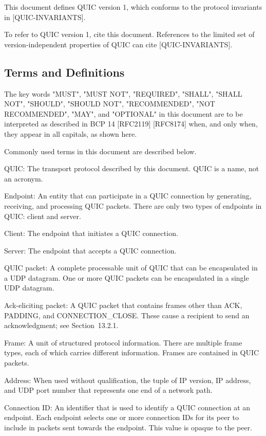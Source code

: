 \documentclass{article}
\begin{document}
\begin{itemize}
\begin{itemize}
This document defines QUIC version 1, which conforms to the protocol invariants in [QUIC-INVARIANTS].

To refer to QUIC version 1, cite this document.  References to the limited set of version-independent properties of QUIC can cite [QUIC-INVARIANTS].

\end{itemize}
\end{itemize}
\subsection{Terms and Definitions}

The key words "MUST", "MUST NOT", "REQUIRED", "SHALL", "SHALL NOT", "SHOULD", "SHOULD NOT", "RECOMMENDED", "NOT RECOMMENDED", "MAY", and "OPTIONAL" in this document are to be interpreted as described in BCP 14 [RFC2119] [RFC8174] when, and only when, they appear in all capitals, as shown here.

Commonly used terms in this document are described below.

QUIC:  The transport protocol described by this document.  QUIC is a name, not an acronym.

Endpoint:  An entity that can participate in a QUIC connection by generating, receiving, and processing QUIC packets.  There are only two types of endpoints in QUIC: client and server.

Client:  The endpoint that initiates a QUIC connection.

Server:  The endpoint that accepts a QUIC connection.

QUIC packet:  A complete processable unit of QUIC that can be encapsulated in a UDP datagram.  One or more QUIC packets can be encapsulated in a single UDP datagram.

Ack-eliciting packet:  A QUIC packet that contains frames other than ACK, PADDING, and CONNECTION\_CLOSE.  These cause a recipient to send an acknowledgment; see Section~13.2.1.

Frame:  A unit of structured protocol information.  There are multiple frame types, each of which carries different information. Frames are contained in QUIC packets.

Address:  When used without qualification, the tuple of IP version, IP address, and UDP port number that represents one end of a network path.

Connection ID:  An identifier that is used to identify a QUIC connection at an endpoint.  Each endpoint selects one or more connection IDs for its peer to include in packets sent towards the endpoint.  This value is opaque to the peer.
\end{document}
